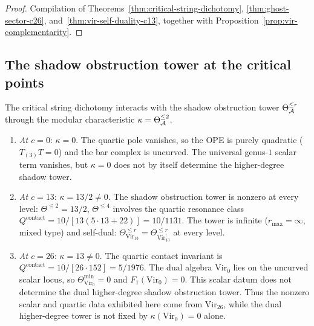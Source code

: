 \begin{proof}
Compilation of
Theorems~\ref{thm:critical-string-dichotomy},
\ref{thm:ghost-sector-c26},
and~\ref{thm:vir-self-duality-c13}, together with
Proposition~\ref{prop:vir-complementarity}.
\end{proof}

%
%

\subsection{The shadow obstruction tower at the critical points}
\label{subsec:shadow-critical}

The critical string dichotomy interacts with the shadow obstruction tower
$\Theta_{\mathcal{A}}^{\leq r}$ through the modular characteristic
$\kappa = \Theta_{\mathcal{A}}^{\leq 2}$.

\begin{proposition}
\label{prop:shadow-critical}
\begin{enumerate}[label=\textup{(\roman*)}]
\item \emph{At $c = 0$}: $\kappa = 0$. The quartic pole vanishes, so
the OPE is purely quadratic ($T_{(3)}T = 0$) and the bar complex is
uncurved. The universal genus-$1$ scalar term vanishes, but
$\kappa = 0$ does not by itself determine the higher-degree shadow
tower.

\item \emph{At $c = 13$}: $\kappa = 13/2 \neq 0$. The shadow obstruction tower
is nonzero at every level: $\Theta^{\leq 2} = 13/2$,
$\Theta^{\leq 4}$ involves the quartic resonance class
$Q^{\mathrm{contact}} = 10/[13(5\cdot 13 + 22)] = 10/1131$.
The tower is infinite ($r_{\max} = \infty$, mixed type) and
self-dual: $\Theta_{\mathrm{Vir}_{13}}^{\leq r} =
\Theta_{\mathrm{Vir}_{13}^!}^{\leq r}$ at every level.

\item \emph{At $c = 26$}: $\kappa = 13 \neq 0$. The quartic
contact invariant is
$Q^{\mathrm{contact}} = 10/[26 \cdot 152] = 5/1976$.
The dual algebra $\mathrm{Vir}_0$ lies on the uncurved scalar locus,
so $\Theta_{\mathrm{Vir}_0}^{\min} = 0$ and
$F_1(\mathrm{Vir}_0) = 0$. This scalar datum does not determine the
dual higher-degree shadow obstruction tower. Thus the nonzero scalar and quartic
data exhibited here come from $\mathrm{Vir}_{26}$, while the dual
higher-degree tower is not fixed by $\kappa(\mathrm{Vir}_0)=0$ alone.
\end{enumerate}
\end{proposition}

